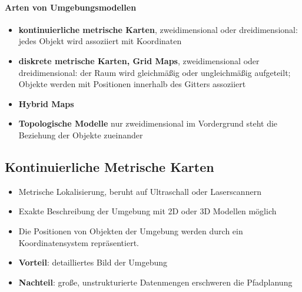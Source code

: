 \paragraph{Arten von Umgebungsmodellen}
\begin{itemize}
	\item \textbf{kontinuierliche metrische Karten}, zweidimensional oder dreidimensional:
	\subitem jedes Objekt wird assoziiert mit Koordinaten
	\item \textbf{diskrete metrische Karten, Grid Maps}, zweidimensional oder dreidimensional:
	\subitem der Raum wird gleichmäßig oder ungleichmäßig aufgeteilt; Objekte werden mit Positionen innerhalb des Gitters assoziiert
	\item \textbf{Hybrid Maps}
	\item \textbf{Topologische Modelle} nur zweidimensional
	\subitem im Vordergrund steht die Beziehung der Objekte zueinander
\end{itemize}
\subsection{Kontinuierliche Metrische Karten}
\begin{itemize}
	\item Metrische Lokalisierung, beruht auf Ultraschall oder Laserscannern
	\item Exakte Beschreibung der Umgebung mit 2D oder 3D Modellen möglich
	\item Die Positionen von Objekten der Umgebung werden durch ein Koordinatensystem repräsentiert.
	\item \textbf{Vorteil}: detailliertes Bild der Umgebung
	\item \textbf{Nachteil}: große, unstrukturierte Datenmengen erschweren die Pfadplanung
\end{itemize}
